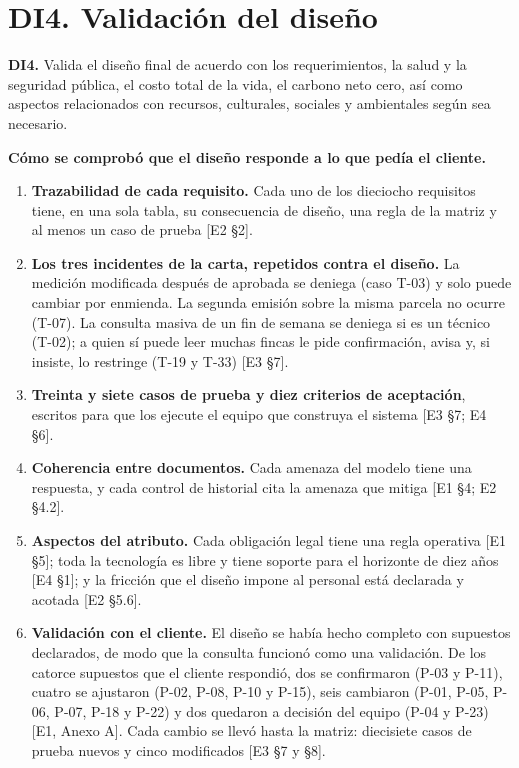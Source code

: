 \documentclass[11pt,letterpaper]{article}
\newcommand{\ev}[1]{\textrm{\small [#1]}}   %
\begin{document}
\section{DI4. Validación del diseño}

\begin{literal}
\textbf{DI4.} Valida el diseño final de acuerdo con los requerimientos, la salud y la seguridad pública,
el costo total de la vida, el carbono neto cero, así como aspectos relacionados con recursos, culturales,
sociales y ambientales según sea necesario.
\end{literal}

\textbf{Cómo se comprobó que el diseño responde a lo que pedía el cliente.}

\begin{enumerate}
\item \textbf{Trazabilidad de cada requisito.} Cada uno de los dieciocho requisitos tiene, en una sola
      tabla, su consecuencia de diseño, una regla de la matriz y al menos un caso de prueba
      \ev{E2 §2}.
\item \textbf{Los tres incidentes de la carta, repetidos contra el diseño.} La medición modificada después
      de aprobada se deniega (caso T-03) y solo puede cambiar por enmienda. La segunda emisión sobre la
      misma parcela no ocurre (T-07). La consulta masiva de un fin de semana se deniega si es un
      técnico (T-02); a quien sí puede leer muchas fincas le pide confirmación, avisa y, si insiste,
      lo restringe (T-19 y T-33) \ev{E3 §7}.
\item \textbf{Treinta y siete casos de prueba y diez criterios de aceptación}, escritos para que los
      ejecute el equipo que construya el sistema \ev{E3 §7; E4 §6}.
\item \textbf{Coherencia entre documentos.} Cada amenaza del modelo tiene una respuesta, y cada control de
      historial cita la amenaza que mitiga \ev{E1 §4; E2 §4.2}.
\item \textbf{Aspectos del atributo.} Cada obligación legal tiene una regla operativa \ev{E1 §5}; toda la
      tecnología es libre y tiene soporte para el horizonte de diez años \ev{E4 §1}; y la fricción que el
      diseño impone al personal está declarada y acotada \ev{E2 §5.6}.
\item \textbf{Validación con el cliente.} El diseño se había hecho completo con supuestos declarados, de
      modo que la consulta funcionó como una validación. De los catorce supuestos que el cliente
      respondió, dos se confirmaron (P-03 y P-11), cuatro se ajustaron (P-02, P-08, P-10 y P-15), seis
      cambiaron (P-01, P-05, P-06, P-07, P-18 y P-22) y dos quedaron a decisión del equipo (P-04 y
      P-23) \ev{E1, Anexo A}. Cada cambio se llevó hasta la matriz: diecisiete casos de prueba nuevos y
      cinco modificados \ev{E3 §7 y §8}.
\end{enumerate}
\end{document}
